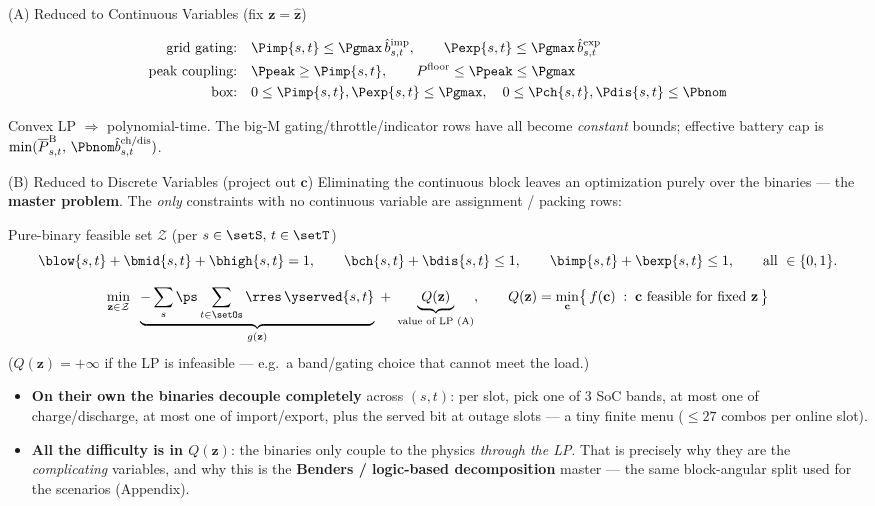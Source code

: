 \begin{frame}{(A) Reduced to Continuous Variables (fix $\mathbf z=\hat{\mathbf z}$)}
\begin{block}{}
\begin{align*}
\text{grid gating:}\quad & \Pimp{s,t}\le \Pgmax\,\hat b^{\text{imp}}_{s,t},\qquad \Pexp{s,t}\le \Pgmax\,\hat b^{\text{exp}}_{s,t}\\
\text{peak coupling:}\quad & \Ppeak\ge \Pimp{s,t},\qquad P^{\text{floor}}\le\Ppeak\le\Pgmax\\
\text{box:}\quad & 0\le \Pimp{s,t},\Pexp{s,t}\le\Pgmax,\quad 0\le \Pch{s,t},\Pdis{s,t}\le\Pbnom
\end{align*}
\end{block}
\vspace{-0.3em}
{\footnotesize Convex LP $\Rightarrow$ polynomial-time. The big-M gating/throttle/indicator rows have all become \emph{constant} bounds; effective battery cap is $\min(\overline P^{\text{B}}_{s,t},\,\Pbnom\hat b^{\text{ch/dis}}_{s,t})$.}
\end{frame}

\begin{frame}{(B) Reduced to Discrete Variables (project out $\mathbf c$)}
Eliminating the continuous block leaves an optimization purely over the binaries — the \textbf{master problem}. The \emph{only} constraints with no continuous variable are assignment / packing rows:
\begin{block}{Pure-binary feasible set $\mathcal Z$ (per $s\in\setS,\,t\in\setT$)}
\[
\blow{s,t}+\bmid{s,t}+\bhigh{s,t}=1,\qquad
\bch{s,t}+\bdis{s,t}\le 1,\qquad
\bimp{s,t}+\bexp{s,t}\le 1,\qquad
\text{all }\in\{0,1\}.
\]
\end{block}
\vspace{-0.2em}
\[
\min_{\mathbf z\in\mathcal Z}\;\;
\underbrace{-\sum_{s}\ps\sum_{t\in\setOs}\rres\,\yserved{s,t}}_{g(\mathbf z)}
\;+\;
\underbrace{\;Q(\mathbf z)\;}_{\text{value of LP (A)}},
\qquad
Q(\mathbf z)=\min_{\mathbf c}\bigl\{\,f(\mathbf c)\;:\;\mathbf c\ \text{feasible for fixed }\mathbf z\,\bigr\}
\]
($Q(\mathbf z)=+\infty$ if the LP is infeasible — e.g.\ a band/gating choice that cannot meet the load.)
\begin{itemize}\footnotesize
  \item \textbf{On their own the binaries decouple completely} across $(s,t)$: per slot, pick one of 3 SoC bands, at most one of charge/discharge, at most one of import/export, plus the served bit at outage slots — a tiny finite menu ($\le 27$ combos per online slot).
  \item \textbf{All the difficulty is in $Q(\mathbf z)$}: the binaries only couple to the physics \emph{through the LP}. That is precisely why they are the \emph{complicating} variables, and why this is the \textbf{Benders / logic-based decomposition} master — the same block-angular split used for the scenarios (Appendix).
\end{itemize}
\end{frame}

